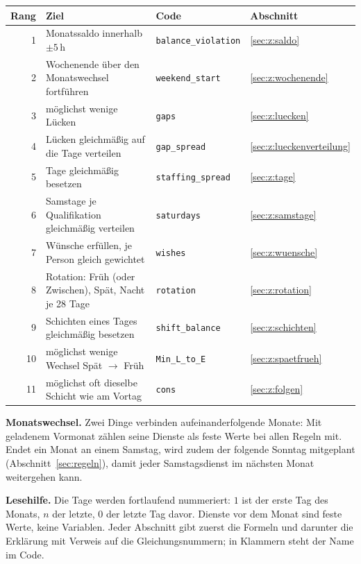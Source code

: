 \documentclass[11pt]{combiArticle}
\newcommand{\code}[1]{\texttt{#1}}
\begin{document}
\begin{center}
\small
\begin{tabular}{r l l l}
\hline
Rang & Ziel & Code & Abschnitt \\
\hline
1 & Monatssaldo innerhalb $\pm 5$\,h & \code{balance\_violation} & \ref{sec:z:saldo} \\
2 & Wochenende über den Monatswechsel fortführen & \code{weekend\_start} & \ref{sec:z:wochenende} \\
3 & möglichst wenige Lücken & \code{gaps} & \ref{sec:z:luecken} \\
4 & Lücken gleichmäßig auf die Tage verteilen & \code{gap\_spread} & \ref{sec:z:lueckenverteilung} \\
5 & Tage gleichmäßig besetzen & \code{staffing\_spread} & \ref{sec:z:tage} \\
6 & Samstage je Qualifikation gleichmäßig verteilen & \code{saturdays} & \ref{sec:z:samstage} \\
7 & Wünsche erfüllen, je Person gleich gewichtet & \code{wishes} & \ref{sec:z:wuensche} \\
8 & Rotation: Früh (oder Zwischen), Spät, Nacht je 28 Tage & \code{rotation} & \ref{sec:z:rotation} \\
9 & Schichten eines Tages gleichmäßig besetzen & \code{shift\_balance} & \ref{sec:z:schichten} \\
10 & möglichst wenige Wechsel Spät $\to$ Früh & \code{Min\_L\_to\_E} & \ref{sec:z:spaetfrueh} \\
11 & möglichst oft dieselbe Schicht wie am Vortag & \code{cons} & \ref{sec:z:folgen} \\
\hline
\end{tabular}
\end{center}

\textbf{Monatswechsel.} Zwei Dinge verbinden aufeinanderfolgende Monate: Mit geladenem Vormonat zählen seine
Dienste als feste Werte bei allen Regeln mit. Endet ein Monat an einem Samstag, wird zudem der folgende Sonntag
mitgeplant (Abschnitt~\ref{sec:regeln}), damit jeder Samstagsdienst im nächsten Monat weitergehen kann.

\textbf{Lesehilfe.} Die Tage werden fortlaufend nummeriert: $1$ ist der erste Tag des Monats, $n$ der letzte,
$0$ der letzte Tag davor. Dienste vor dem Monat sind feste Werte, keine Variablen. Jeder Abschnitt gibt zuerst
die Formeln und darunter die Erklärung mit Verweis auf die Gleichungsnummern; in Klammern steht der Name im Code.

\end{document}

